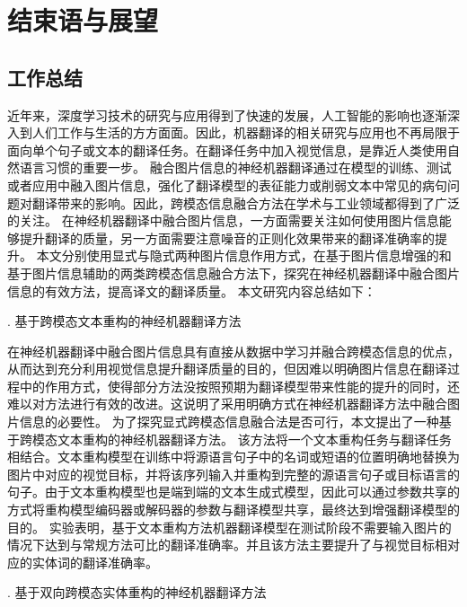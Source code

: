 \chapter{结束语与展望}

\section{工作总结}
近年来，深度学习技术的研究与应用得到了快速的发展，人工智能的影响也逐渐深入到人们工作与生活的方方面面。因此，机器翻译的相关研究与应用也不再局限于面向单个句子或文本的翻译任务。在翻译任务中加入视觉信息，是靠近人类使用自然语言习惯的重要一步。
融合图片信息的神经机器翻译通过在模型的训练、测试或者应用中融入图片信息，强化了翻译模型的表征能力或削弱文本中常见的病句问题对翻译带来的影响。因此，跨模态信息融合方法在学术与工业领域都得到了广泛的关注。
在神经机器翻译中融合图片信息，一方面需要关注如何使用图片信息能够提升翻译的质量，另一方面需要注意噪音的正则化效果带来的翻译准确率的提升。
本文分别使用显式与隐式两种图片信息作用方式，在基于图片信息增强的和基于图片信息辅助的两类跨模态信息融合方法下，探究在神经机器翻译中融合图片信息的有效方法，提高译文的翻译质量。
本文研究内容总结如下：

{. 基于跨模态文本重构的神经机器翻译方法}

在神经机器翻译中融合图片信息具有直接从数据中学习并融合跨模态信息的优点，从而达到充分利用视觉信息提升翻译质量的目的，但因难以明确图片信息在翻译过程中的作用方式，使得部分方法没按照预期为翻译模型带来性能的提升的同时，还难以对方法进行有效的改进。这说明了采用明确方式在神经机器翻译方法中融合图片信息的必要性。
为了探究显式跨模态信息融合法是否可行，本文提出了一种基于跨模态文本重构的神经机器翻译方法。
该方法将一个文本重构任务与翻译任务相结合。文本重构模型在训练中将源语言句子中的名词或短语的位置明确地替换为图片中对应的视觉目标，并将该序列输入并重构到完整的源语言句子或目标语言的句子。由于文本重构模型也是端到端的文本生成式模型，因此可以通过参数共享的方式将重构模型编码器或解码器的参数与翻译模型共享，最终达到增强翻译模型的目的。
实验表明，基于文本重构方法机器翻译模型在测试阶段不需要输入图片的情况下达到与常规方法可比的翻译准确率。并且该方法主要提升了与视觉目标相对应的实体词的翻译准确率。

{. 基于双向跨模态实体重构的神经机器翻译方法}

